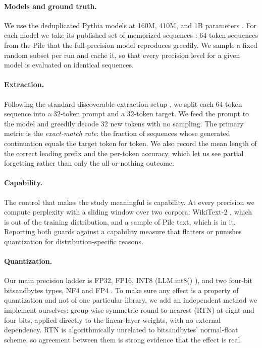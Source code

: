 \documentclass{article}
\begin{document}
\paragraph{Models and ground truth.}
We use the deduplicated Pythia models at 160M, 410M, and 1B parameters
\citep{biderman2023pythia}. For each model we take its published set of
memorized sequences \citep{biderman2023emergent}: 64-token sequences from the
Pile that the full-precision model reproduces greedily. We sample a fixed
random subset per run and cache it, so that every precision level for a given
model is evaluated on identical sequences.

\paragraph{Extraction.}
Following the standard discoverable-extraction setup
\citep{carlini2022quantifying}, we split each 64-token sequence into a
32-token prompt and a 32-token target. We feed the prompt to the model and
greedily decode 32 new tokens with no sampling. The primary metric is the
\emph{exact-match rate}: the fraction of sequences whose generated
continuation equals the target token for token. We also record the mean
length of the correct leading prefix and the per-token accuracy, which let us
see partial forgetting rather than only the all-or-nothing outcome.

\paragraph{Capability.}
The control that makes the study meaningful is capability. At every precision
we compute perplexity with a sliding window over two corpora: WikiText-2
\citep{merity2016pointer}, which is out of the training distribution, and a
sample of Pile text, which is in it. Reporting both guards against a
capability measure that flatters or punishes quantization for
distribution-specific reasons.

\paragraph{Quantization.}
Our main precision ladder is FP32, FP16, INT8 (LLM.int8()
\citep{dettmers2022int8}), and two four-bit bitsandbytes types, NF4 and FP4
\citep{dettmers2023qlora}. To make sure any effect is a property of
quantization and not of one particular library, we add an independent method
we implement ourselves: group-wise symmetric round-to-nearest (RTN) at eight
and four bits, applied directly to the linear-layer weights, with no external
dependency. RTN is algorithmically unrelated to bitsandbytes' normal-float
scheme, so agreement between them is strong evidence that the effect is real.
\end{document}
